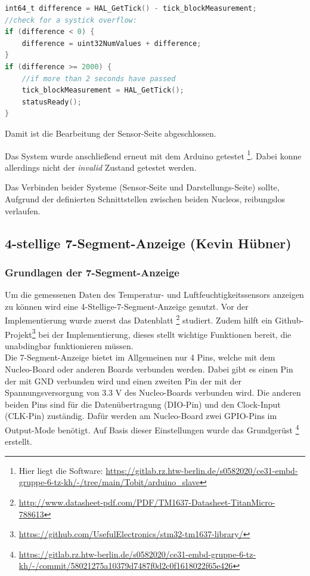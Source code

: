 \documentclass[11pt,a4paper,titlepage]{article}
\begin{document}
\begin{lstlisting}[language=C, label={code:blockMeasurement}, caption={Blockieren des Startsignals}]
int64_t difference = HAL_GetTick() - tick_blockMeasurement;
//check for a systick overflow:
if (difference < 0) {
    difference = uint32NumValues + difference;
}
if (difference >= 2000) {
    //if more than 2 seconds have passed
    tick_blockMeasurement = HAL_GetTick();
    statusReady();
}
\end{lstlisting}

Damit ist die Bearbeitung der Sensor-Seite abgeschlossen.

Das System wurde anschließend erneut mit dem Arduino getestet
\footnote{Hier liegt die Software: \url{https://gitlab.rz.htw-berlin.de/s0582020/ce31-embd-gruppe-6-tz-kh/-/tree/main/Tobit/arduino_slave}}.
Dabei konne allerdings nicht der \textit{invalid} Zustand getestet werden.

Das Verbinden beider Systeme (Sensor-Seite und Darstellungs-Seite) sollte,
Aufgrund der definierten Schnittstellen zwischen beiden Nucleos,
reibungslos verlaufen.

\newpage
\subsection{4-stellige 7-Segment-Anzeige (Kevin Hübner)}
\label{sec:7-seg-anzeige}

\subsubsection{Grundlagen der 7-Segment-Anzeige}

Um die gemessenen Daten des Temperatur- und Luftfeuchtigkeitssensors anzeigen zu können wird eine 4-Stellige-7-Segment-Anzeige genutzt.
Vor der Implementierung wurde zuerst das Datenblatt
\footnote{\url{http://www.datasheet-pdf.com/PDF/TM1637-Datasheet-TitanMicro-788613}}
studiert.
Zudem hilft ein Github-Projekt\footnote{\url{https://github.com/UsefulElectronics/stm32-tm1637-library/}} bei der Implementierung,
dieses stellt wichtige Funktionen bereit, die unabdingbar funktionieren müssen.\\

Die 7-Segment-Anzeige bietet im Allgemeinen nur 4 Pins, welche mit dem Nucleo-Board oder anderen Boards verbunden werden.
Dabei gibt es einen Pin der mit GND verbunden wird und einen zweiten Pin der mit der Spannungsversorgung von 3.3 V des Nucleo-Boards verbunden wird.
Die anderen beiden Pins sind für die Datenübertragung (DIO-Pin) und den Clock-Input (CLK-Pin) zuständig.
Dafür werden am Nucleo-Board zwei GPIO-Pins im Output-Mode benötigt.
Auf Basis dieser Einstellungen wurde das Grundgerüst
\footnote{\url{https://gitlab.rz.htw-berlin.de/s0582020/ce31-embd-gruppe-6-tz-kh/-/commit/58021275a10379d7487f0d2c0f1618022f65e426}}
erstellt.\\
\end{document}

